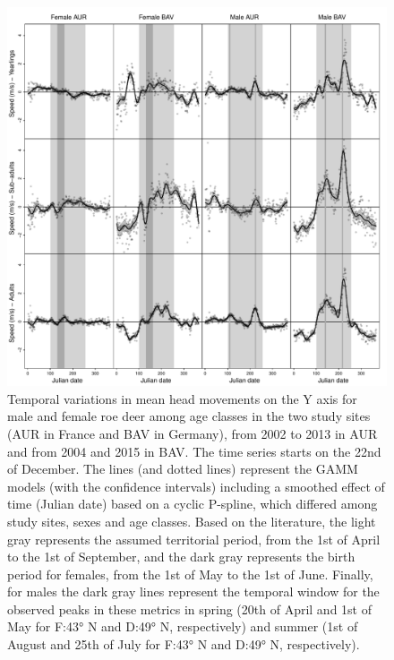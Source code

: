 \documentclass[a4paper,11pt]{article}
\begin{document}
\newpage
\begin{figure} [!h]
  \centering
  \includegraphics[width=0.9\linewidth]{./figures/Fig3b.pdf}
  \caption{Temporal variations in mean head movements on the Y axis
    for male and female roe deer among age classes in the two study
    sites (AUR in France and BAV in Germany), from 2002 to 2013 in AUR
    and from 2004 and 2015 in BAV. The time series starts on the 22nd
    of December. The lines (and dotted lines) represent the GAMM
    models (with the confidence intervals) including a smoothed effect
    of time (Julian date) based on a cyclic P-spline, which differed
    among study sites, sexes and age classes. Based on the literature,
    the light gray represents the assumed territorial period, from the
    1st of April to the 1st of September, and the dark gray represents
    the birth period for females, from the 1st of May to the 1st of
    June. Finally, for males the dark gray lines represent the
    temporal window for the observed peaks in these metrics in spring
    (20th of April and 1st of May for F:43° N and D:49° N,
    respectively) and summer (1st of August and 25th of July for F:43°
    N and D:49° N, respectively).}\label{fig:age}
\end{figure}
\end{document}
